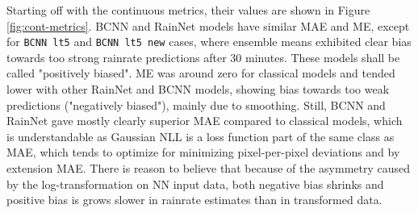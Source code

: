 Starting off with the continuous metrics, their values are shown in Figure \ref{fig:cont-metrics}. BCNN and RainNet models have similar MAE and ME, except for \texttt{BCNN lt5} and \texttt{BCNN lt5 new} cases, where ensemble means exhibited clear bias towards too strong rainrate predictions after 30 minutes. These models shall be called "positively biased". ME was around zero for classical models and tended lower with other RainNet and BCNN models, showing bias towards too weak predictions ("negatively biased"), mainly due to smoothing. Still, BCNN and RainNet gave mostly clearly superior MAE compared to classical models, which is understandable as Gaussian NLL is a loss function part of the same class as MAE, which tends to optimize for minimizing pixel-per-pixel deviations and by extension MAE. There is reason to believe that because of the asymmetry caused by the log-transformation on NN input data, both negative bias shrinks and positive bias is grows slower in rainrate estimates than in transformed data.

